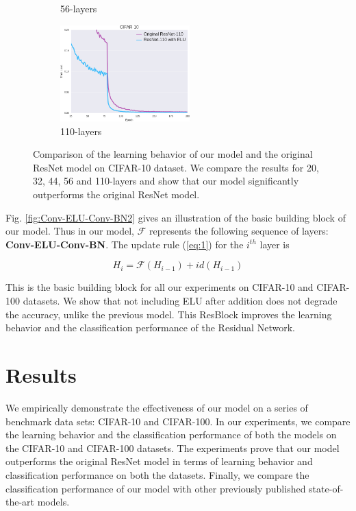 \documentclass[10pt,twocolumn,letterpaper]{article}
\begin{document}
\begin{figure}
\begin{subfigure}{.4\linewidth}
        \caption{56-layers}
        \label{fig:Cifar10TrainLoss56}
    \end{subfigure}
    \begin{subfigure}{.4\linewidth}
        \centering
        \includegraphics[width=5cm]{TrainLoss110}
        \caption{110-layers}
        \label{fig:Cifar10TrainLoss110}
    \end{subfigure}
    \caption{Comparison of the learning behavior of our model and the original ResNet model on CIFAR-10 dataset. We compare the results for 20, 32, 44, 56 and 110-layers and show that our model significantly outperforms the original ResNet model.}
    \label{fig:Cifar10TrainLoss}
\end{figure}

Fig. \ref{fig:Conv-ELU-Conv-BN2} gives an illustration of the basic building block of our model. Thus in our model, \(\mathcal{F}\) represents the following sequence of layers: \textbf{Conv-ELU-Conv-BN}. The update rule (\ref{eq:1}) for the \(i^{th}\) layer is 

\begin{equation} \label{eq:2}
 H_i = \mathcal{F}(H_{i-1}) + id(H_{i-1})
\end{equation}

This is the basic building block for all our experiments on CIFAR-10 and CIFAR-100 datasets. We show that not including ELU after addition does not degrade the accuracy, unlike the previous model. This ResBlock improves the learning behavior and the classification performance of the Residual Network. 






\section{Results}

We empirically demonstrate the effectiveness of our model on a series of benchmark data sets: CIFAR-10 and CIFAR-100. In our experiments, we compare the learning behavior and the classification performance of both the models on the CIFAR-10 and CIFAR-100 datasets. The experiments prove that our model outperforms the original ResNet model in terms of learning behavior and classification performance on both the datasets. Finally, we compare the classification performance of our model with other previously published state-of-the-art models.  
\end{document}
